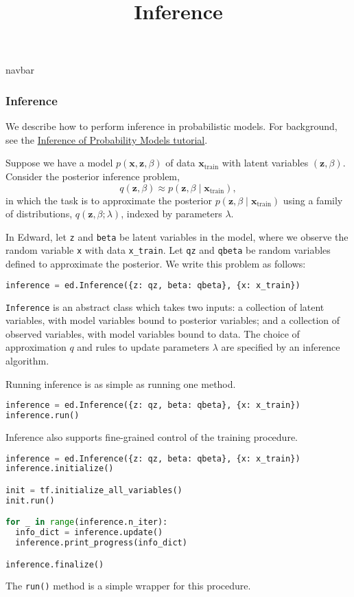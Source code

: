 \title{Inference}

{{navbar}}

\subsubsection{Inference}

We describe how to perform inference in probabilistic models.
For background, see the
\href{/tutorials/inference} {Inference of Probability Models
tutorial}.

Suppose we have a model $p(\mathbf{x}, \mathbf{z}, \beta)$ of data $\mathbf{x}_{\text{train}}$ with latent variables $(\mathbf{z}, \beta)$.
Consider the posterior inference problem,
\begin{equation*}
q(\mathbf{z}, \beta)\approx p(\mathbf{z}, \beta\mid \mathbf{x}_{\text{train}}),
\end{equation*}
in which the task is to approximate the posterior
$p(\mathbf{z}, \beta\mid \mathbf{x}_{\text{train}})$
using a family of distributions, $q(\mathbf{z},\beta; \lambda)$,
indexed by parameters $\lambda$.

In Edward, let \texttt{z} and \texttt{beta} be latent variables in the model,
where we observe the random variable \texttt{x} with
data \texttt{x_train}.
Let \texttt{qz} and \texttt{qbeta} be random variables defined to
approximate the posterior.
We write this problem as follows:

\begin{lstlisting}[language=Python]
inference = ed.Inference({z: qz, beta: qbeta}, {x: x_train})
\end{lstlisting}

\texttt{Inference} is an abstract class which
takes two inputs: a collection of latent variables, with model
variables bound to posterior variables; and a collection of observed
variables, with model variables bound to data.
The choice of approximation $q$ and rules to update parameters
$\lambda$ are specified by an inference algorithm.

Running inference is as simple as running one method.
\begin{lstlisting}[language=Python]
inference = ed.Inference({z: qz, beta: qbeta}, {x: x_train})
inference.run()
\end{lstlisting}
%
Inference also supports fine-grained control of the training procedure.
%
\begin{lstlisting}[language=Python]
inference = ed.Inference({z: qz, beta: qbeta}, {x: x_train})
inference.initialize()

init = tf.initialize_all_variables()
init.run()

for _ in range(inference.n_iter):
  info_dict = inference.update()
  inference.print_progress(info_dict)

inference.finalize()
\end{lstlisting}
The \texttt{run()} method is a simple wrapper for this procedure.

